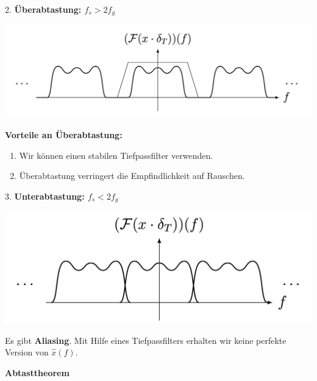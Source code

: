 \documentclass[14pt, aspectratio=169, handout]{beamer}
\begin{document}
\begin{frame}{2. \textcolor{myblue}{\textbf{Überabtastung: $f_s > 2f_g$}}}
    \begin{center}
        \includegraphics[width=0.85\linewidth]{figures/ueberabtast.png}
    \end{center}

\textbf{Vorteile an Überabtastung:}
\begin{enumerate}
    \item Wir können einen stabilen Tiefpassfilter verwenden.
    \item Überabtastung verringert die Empfindlichkeit auf Rauschen.
\end{enumerate}
\end{frame}

\begin{frame}{3. \textcolor{myblue}{\textbf{Unterabtastung: $f_s < 2 f_g$}}}
    \begin{center}
        \includegraphics[width=0.8\linewidth]{figures/aliasing1.png}
    \end{center}
    Es gibt \textbf{Aliasing}. Mit Hilfe eines Tiefpassfilters erhalten wir keine perfekte Version von $\hat{x}(f)$.
\end{frame}

\begin{frame}{\textcolor{myblue}{\textbf{Abtasttheorem}}}
\end{frame}
\end{document}
